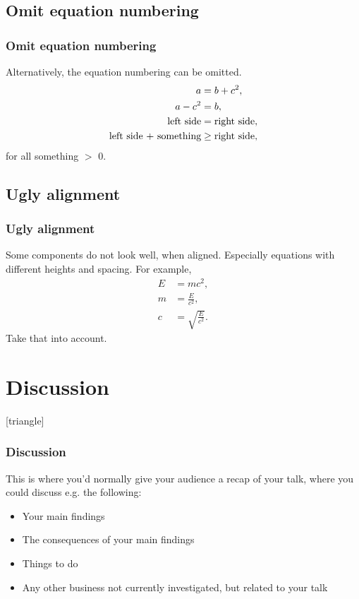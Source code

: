 \documentclass[9pt]{beamer}
\begin{document}
\subsection{Omit equation numbering}
{
\begin{frame}
\frametitle{Omit equation numbering}

Alternatively, the equation numbering can be omitted. \\
\begin{align}
    a &= b + c^2, \notag\\
    a - c^2 &= b, \notag\\
    \text{left side} &= \text{right side}, \notag\\
    \text{left side + something} &\geq \text{right side}, \notag
\end{align}
for all something $>$ 0.

\end{frame}
}

\subsection{Ugly alignment}
{
\begin{frame}
\frametitle{Ugly alignment}

Some components do not look well, when aligned. Especially equations with different heights and spacing. For example, \\
\begin{align}
    E &= mc^2, \\
    m &= \frac{E}{c^2}, \\
    c &= \sqrt{\frac{E}{c^2}}.
\end{align}
Take that into account.

\end{frame}
}

\section{Discussion}
{
[triangle]
\begin{frame}
\frametitle{Discussion}

This is where you’d normally give your audience a recap of your talk, where you could discuss e.g. the following:
\begin{itemize}
    \item Your main findings
    \item The consequences of your main findings
    \item Things to do
    \item Any other business not currently investigated, but related to your talk
\end{itemize}

\end{frame}
}
\end{document}
